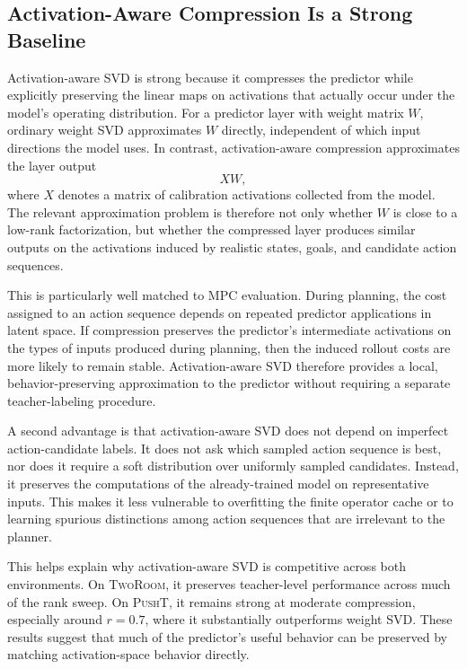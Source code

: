 \documentclass[11pt]{article}
\begin{document}
\subsection{Activation-Aware Compression Is a Strong Baseline}
\label{sec:activation_svd_analysis}

Activation-aware SVD is strong because it compresses the predictor while explicitly preserving the linear maps on activations that actually occur under the model's operating distribution. For a predictor layer with weight matrix \(W\), ordinary weight SVD approximates \(W\) directly, independent of which input directions the model uses. In contrast, activation-aware compression approximates the layer output
\[
    XW,
\]
where \(X\) denotes a matrix of calibration activations collected from the model. The relevant approximation problem is therefore not only whether \(W\) is close to a low-rank factorization, but whether the compressed layer produces similar outputs on the activations induced by realistic states, goals, and candidate action sequences.

This is particularly well matched to MPC evaluation. During planning, the cost assigned to an action sequence depends on repeated predictor applications in latent space. If compression preserves the predictor's intermediate activations on the types of inputs produced during planning, then the induced rollout costs are more likely to remain stable. Activation-aware SVD therefore provides a local, behavior-preserving approximation to the predictor without requiring a separate teacher-labeling procedure.

A second advantage is that activation-aware SVD does not depend on imperfect action-candidate labels. It does not ask which sampled action sequence is best, nor does it require a soft distribution over uniformly sampled candidates. Instead, it preserves the computations of the already-trained model on representative inputs. This makes it less vulnerable to overfitting the finite operator cache or to learning spurious distinctions among action sequences that are irrelevant to the planner.

This helps explain why activation-aware SVD is competitive across both environments. On \textsc{TwoRoom}, it preserves teacher-level performance across much of the rank sweep. On \textsc{PushT}, it remains strong at moderate compression, especially around \(r=0.7\), where it substantially outperforms weight SVD. These results suggest that much of the predictor's useful behavior can be preserved by matching activation-space behavior directly.
\end{document}
